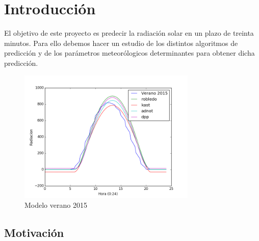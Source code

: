 \cleardoublepage

\chapter{Introducción}
\label{makereference}

El objetivo de este proyecto es predecir la radiación solar en un plazo de treinta minutos. Para ello debemos hacer un estudio de los distintos algoritmos de predicción y de los parámetros meteorólogicos determinantes para obtener dicha predicción.


\begin{figure}[htb]%
	
	\begin{center}
		\includegraphics[height=2.5in]{figures/verano2015.png}
		\caption{Modelo verano 2015}
	\end{center}
    
    \label{figure1}
\end{figure}


\section{Motivación}
\label{makereference1.1}

